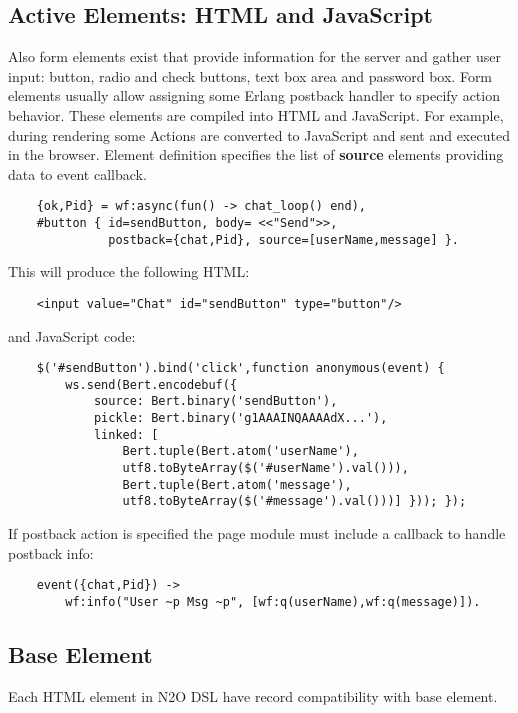 \newpage
\subsection{Active Elements: HTML and JavaScript}
Also form elements exist that provide information for the server
and gather user input: button, radio and check buttons, text box area and password box.
Form elements usually allow assigning some Erlang postback handler to specify action behavior.
These elements are compiled into HTML and JavaScript. For example, during rendering some
Actions are converted to JavaScript and sent and executed in the browser.
Element definition specifies the list of {\bf source} elements providing data to event callback.

\vspace{1\baselineskip}
\begin{lstlisting}
    {ok,Pid} = wf:async(fun() -> chat_loop() end),
    #button { id=sendButton, body= <<"Send">>, 
              postback={chat,Pid}, source=[userName,message] }.
\end{lstlisting}
\vspace{1\baselineskip}

This will produce the following HTML:
\begin{lstlisting}
    <input value="Chat" id="sendButton" type="button"/>
\end{lstlisting}
and JavaScript code:
\begin{lstlisting}
    $('#sendButton').bind('click',function anonymous(event) { 
        ws.send(Bert.encodebuf({
            source: Bert.binary('sendButton'), 
            pickle: Bert.binary('g1AAAINQAAAAdX...'),
            linked: [
                Bert.tuple(Bert.atom('userName'),
                utf8.toByteArray($('#userName').val())),
                Bert.tuple(Bert.atom('message'),
                utf8.toByteArray($('#message').val()))] })); });
\end{lstlisting}
\vspace{1\baselineskip}

If postback action is specified the page module must include a callback to handle postback info:
\vspace{1\baselineskip}
\begin{lstlisting}
    event({chat,Pid}) ->
        wf:info("User ~p Msg ~p", [wf:q(userName),wf:q(message)]).
\end{lstlisting}
\vspace{1\baselineskip}

\newpage
\subsection{Base Element}
Each HTML element in N2O DSL have record compatibility with base element.

